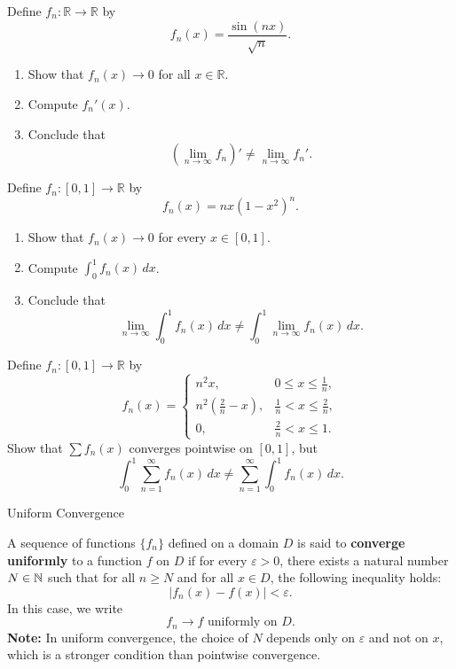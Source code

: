 \documentclass[12pt, a4paper]{article}
\begin{document}
\clearpage

\begin{problem}
Define $f_n:\mathbb{R}\to\mathbb{R}$ by
\[
f_n(x)=\frac{\sin(nx)}{\sqrt{n}}.
\]
\begin{enumerate}
\item Show that $f_n(x)\to 0$ for all $x\in\mathbb{R}$.
\item Compute $f_n'(x)$.
\item Conclude that
\[
\left(\lim_{n\to\infty} f_n\right)' \neq \lim_{n\to\infty} f_n'.
\]
\end{enumerate}
\end{problem}


\clearpage

\begin{problem}
Define $f_n:[0,1]\to\mathbb{R}$ by
\[
f_n(x)=nx(1-x^2)^n.
\]
\begin{enumerate}
\item Show that $f_n(x)\to 0$ for every $x\in[0,1]$.
\item Compute $\displaystyle \int_0^1 f_n(x)\,dx$.
\item Conclude that
\[
\lim_{n\to\infty}\int_0^1 f_n(x)\,dx \ne \int_0^1 \lim_{n\to\infty} f_n(x)\,dx.
\]
\end{enumerate}
\end{problem}

\clearpage

\begin{problem}
Define $f_n:[0,1]\to\mathbb{R}$ by
\[
f_n(x)=
\begin{cases}
n^2x, & 0\le x\le \frac{1}{n},\\
n^2\!\left(\frac{2}{n}-x\right), & \frac{1}{n}<x\le \frac{2}{n},\\
0, & \frac{2}{n}<x\le 1.
\end{cases}
\]
Show that $\sum f_n(x)$ converges pointwise on $[0,1]$, but
\[
\int_0^1 \sum_{n=1}^\infty f_n(x)\,dx
\neq
\sum_{n=1}^\infty \int_0^1 f_n(x)\,dx.
\]
\end{problem}

\clearpage

\begin{heading}
    Uniform Convergence
\end{heading}

\vspace{10pt}

\begin{definition}
    A sequence of functions $\{f_n\}$ defined on a domain $D$ is said to \textbf{converge uniformly} to a function $f$ on $D$ if for every $\varepsilon > 0$, there exists a natural number $N \in \mathbb{N}$ such that for all $n \geq N$ and for all $x \in D$, the following inequality holds:
    \[
    |f_n(x) - f(x)| < \varepsilon.
    \]
    In this case, we write
    \[
    f_n \to f \text{ uniformly on } D.
    \]
    \textbf{Note:} In uniform convergence, the choice of $N$ depends only on $\varepsilon$ and not on $x$, which is a stronger condition than pointwise convergence.
\end{definition}
\end{document}
